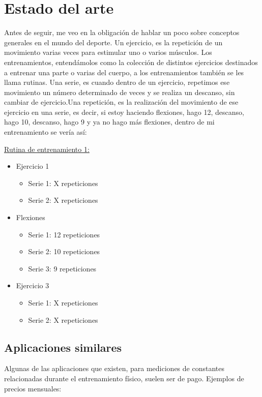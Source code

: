 \chapter{Estado del arte}

Antes de seguir, me veo en la obligación de hablar un poco sobre conceptos generales en el mundo del deporte. Un ejercicio, es la repetición de un movimiento varias veces para estimular uno o varios músculos. Los entrenamientos, entendámolos como la colección de distintos ejercicios destinados a entrenar una parte o varias del cuerpo, a los entrenamientos también se les llama rutinas. Una serie, es cuando dentro de un ejercicio, repetimos ese movimiento un número determinado de veces y se realiza un descanso, sin cambiar de ejercicio.Una repetición, es la realización del movimiento de ese ejercicio en una serie, es decir, si estoy haciendo flexiones, hago 12, descanso, hago 10, descanso, hago 9 y ya no hago más flexiones, dentro de mi entrenamiento se vería así:

\underline {Rutina de entrenamiento 1:}
\begin{itemize}
	\item Ejercicio 1
	\begin{itemize}
		\item Serie 1: X repeticiones
		\item Serie 2: X repeticiones
	\end{itemize}
	\item Flexiones
	\begin{itemize}
		\item Serie 1: 12 repeticiones
		\item Serie 2: 10 repeticiones 
		\item Serie 3: 9 repeticiones
	\end{itemize}
	\item Ejercicio 3
	\begin{itemize}
		\item Serie 1: X repeticiones
		\item Serie 2: X repeticiones
	\end{itemize}
\end{itemize}

\section{Aplicaciones similares}

Algunas de las aplicaciones que existen, para mediciones de constantes relacionadas durante el entrenamiento físico, suelen ser de pago. Ejemplos de precios mensuales:

